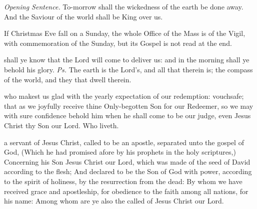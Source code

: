 \clearpage
{}
\par\noindent
\textit{Opening Sentence.} To-morrow shall the wickedness of the earth be done away. And the Saviour of the world shall be King over us.\par

\begin{rubric}
    If Christmas Eve fall on a Sunday, the whole Office of the Mass is of the Vigil, with commemoration of the Sunday, but its Gospel is not read at the end.
\end{rubric}

\introit
{} shall ye know that the Lord will come to deliver us: and in the morning shall ye behold his glory. \textit{Ps.} The earth is the Lord's, and all that therein is; the compass of the world, and they that dwell therein.

\collect
{} who makest us glad with the yearly expectation of our redemption: vouchsafe; that as we joyfully receive thine Only-begotten Son for our Redeemer, so we may with sure confidence behold him when he shall come to be our judge, even Jesus Christ thy Son our Lord. Who liveth.

 a servant of Jesus Christ, called to be an apostle, separated unto the gospel of God, (Which he had promised afore by his prophets in the holy scriptures,) Concerning his Son Jesus Christ our Lord, which was made of the seed of David according to the flesh; And declared to be the Son of God with power, according to the spirit of holiness, by the resurrection from the dead: By whom we have received grace and apostleship, for obedience to the faith among all nations, for his name: Among whom are ye also the called of Jesus Christ our Lord.

